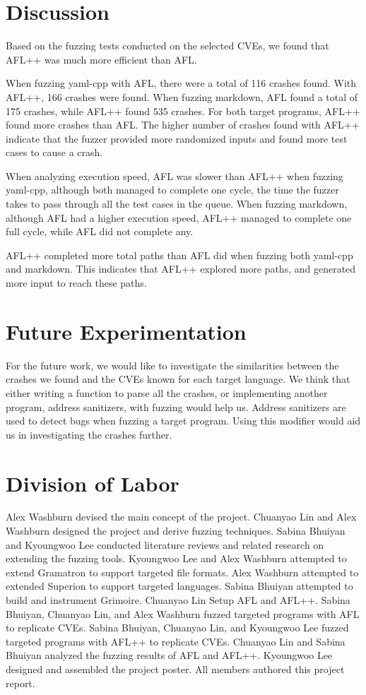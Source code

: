 \documentclass[12pt]{diazessay}
\begin{document}
\section*{Discussion}

Based on the fuzzing tests conducted on the selected CVEs, we found that AFL++ was much more efficient than AFL. 

When fuzzing yaml-cpp with AFL, there were a total of 116 crashes found. With AFL++, 166 crashes were found. When fuzzing markdown, AFL found a total of 175 crashes, while AFL++ found 535 crashes. For both target programs, AFL++ found more crashes than AFL. The higher number of crashes found with AFL++ indicate that the fuzzer provided more randomized inputs and found more test cases to cause a crash.

When analyzing execution speed, AFL was slower than AFL++ when fuzzing yaml-cpp, although both managed to complete one cycle, the time the fuzzer takes to pass through all the test cases in the queue. When fuzzing markdown, although AFL had a higher execution speed, AFL++ managed to complete one full cycle, while AFL did not complete any.

AFL++ completed more total paths than AFL did when fuzzing both yaml-cpp and markdown. This indicates that AFL++ explored more paths, and generated more input to reach these paths.


\section*{Future Experimentation}
For the future work, we would like to investigate the similarities between the crashes we found and the CVEs known for each target language. We think that either writing a function to parse all the crashes, or implementing another program, address sanitizers, with fuzzing would help us. Address sanitizers are used to detect bugs when fuzzing a target program. Using this modifier would aid us in investigating the crashes further.

\clearpage
\section*{Division of Labor}

Alex Washburn devised the main concept of the project.
Chuanyao Lin and Alex Washburn designed the project and derive fuzzing techniques.
Sabina Bhuiyan and Kyoungwoo Lee conducted literature reviews and related research on extending the fuzzing tools.
Kyoungwoo Lee and Alex Washburn attempted to extend Gramatron to support targeted file formats.
Alex Washburn attempted to extended Superion to support targeted languages.
Sabina Bhuiyan attempted to build and instrument Grimoire.
Chuanyao Lin Setup AFL and AFL++.
Sabina Bhuiyan, Chuanyao Lin, and Alex Washburn fuzzed targeted programs with AFL to replicate CVEs.
Sabina Bhuiyan, Chuanyao Lin, and Kyoungwoo Lee fuzzed targeted programs with AFL++ to replicate CVEs. 
Chuanyao Lin and Sabina Bhuiyan analyzed the fuzzing results of AFL and AFL++.
Kyoungwoo Lee designed and assembled the project poster.
All members authored this project report.
\end{document}
